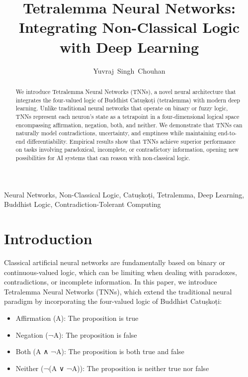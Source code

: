 \documentclass[10pt,journal,compsoc]{IEEEtran}
\begin{document}
\title{Tetralemma Neural Networks: Integrating Non-Classical Logic with Deep Learning}

\author{Yuvraj~Singh~Chouhan}

\maketitle

\begin{abstract}
We introduce Tetralemma Neural Networks (TNNs), a novel neural architecture that integrates the four-valued logic of Buddhist Catuṣkoṭi (tetralemma) with modern deep learning. Unlike traditional neural networks that operate on binary or fuzzy logic, TNNs represent each neuron's state as a tetrapoint in a four-dimensional logical space encompassing affirmation, negation, both, and neither. We demonstrate that TNNs can naturally model contradictions, uncertainty, and emptiness while maintaining end-to-end differentiability. Empirical results show that TNNs achieve superior performance on tasks involving paradoxical, incomplete, or contradictory information, opening new possibilities for AI systems that can reason with non-classical logic.
\end{abstract}

\begin{IEEEkeywords}
Neural Networks, Non-Classical Logic, Catuṣkoṭi, Tetralemma, Deep Learning, Buddhist Logic, Contradiction-Tolerant Computing
\end{IEEEkeywords}

\section{Introduction}
Classical artificial neural networks are fundamentally based on binary or continuous-valued logic, which can be limiting when dealing with paradoxes, contradictions, or incomplete information. In this paper, we introduce Tetralemma Neural Networks (TNNs), which extend the traditional neural paradigm by incorporating the four-valued logic of Buddhist Catuṣkoṭi:

\begin{itemize}
\item Affirmation (A): The proposition is true
\item Negation (¬A): The proposition is false
\item Both (A ∧ ¬A): The proposition is both true and false
\item Neither (¬(A ∨ ¬A)): The proposition is neither true nor false
\end{itemize}
\end{document}
